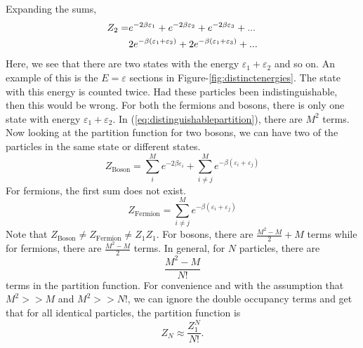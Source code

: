     Expanding the sums,
    \begin{align}
        Z_2 =& e^{-2\beta\varepsilon_1}+e^{-2\beta\varepsilon_2}+e^{-2\beta\varepsilon_3}+...\notag\\
        & 2e^{-\beta(\varepsilon_1+\varepsilon_2)} + 2e^{-\beta(\varepsilon_1+\varepsilon_3)}+...
        \label{eq:distinguishablepartition}
    \end{align}
    Here, we see that there are two states with the energy $\varepsilon_1+\varepsilon_2$ and so on. An example of this is the $E=\varepsilon$ sections in Figure-\ref{fig:distinctenergies}. The state with this energy is counted twice. Had these particles been indistinguishable, then this would be wrong. For both the fermions and bosons, there is only one state with energy $\varepsilon_1+\varepsilon_2$. In (\ref{eq:distinguishablepartition}), there are $M^2$ terms. Now looking at the partition function for two bosons, we can have two of the particles in the same state or different states.
    \begin{equation}
        Z_\mathrm{Boson} = \sum_i^Me^{-2\beta\varepsilon_i} + \sum_{i\neq j}^Me^{-\beta(\varepsilon_i+\varepsilon_j)}
    \end{equation}
    For fermions, the first sum does not exist.
    \begin{equation}
        Z_\mathrm{Fermion} = \sum_{i\neq j}^M e^{-\beta(\varepsilon_i+\varepsilon_j)}
    \end{equation}
    Note that $Z_\mathrm{Boson}\neq Z_\mathrm{Fermion}\neq Z_1Z_1$. For bosons, there are $\frac{M^2-M}{2}+M$ terms while for fermions, there are $\frac{M^2-M}{2}$ terms. In general, for $N$ particles, there are
    \begin{equation}
        \frac{M^2-M}{N!}
    \end{equation}
    terms in the partition function. For convenience and with the assumption that $M^2>>M$ and $M^2>>N!$, we can ignore the double occupancy terms and get that for all identical particles, the partition function is
    \begin{equation}
        Z_N \approx \frac{Z_1^N}{N!}.
    \end{equation}
